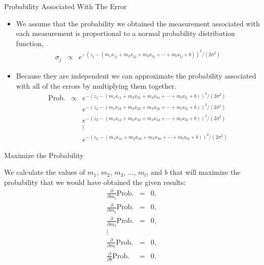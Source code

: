 \documentclass[svgnames,table,,aspectratio=169]{beamer}
\begin{document}
\begin{frame}{Probability Associated With The Error}

  \begin{itemize}
  \item We assume that the probability we obtained the measurement
    associated with each measurement is proportional to a normal
    probability distribution function,
    \begin{eqnarray*}
      \sigma_j & \propto & e^{-\left(z_j - \left(m_1 x_{1j} + m_2 x_{2j} + m_3 x_{3j} + \cdots + m_l x_{lj} + b\right)\right)^2/(2\sigma^2)}
    \end{eqnarray*}
  \item Because they are independent we can approximate the
    probability associated with all of the errors by multiplying them
    together.
    \begin{eqnarray*}
      \mathrm{Prob.} & \propto & e^{-\left(z_1 - \left(m_1 x_{11} + m_2 x_{21} + m_3 x_{31} + \cdots + m_l x_{l1} + b\right)\right)^2/(2\sigma^2)} \\
      & & e^{-\left(z_2 - \left(m_1 x_{12} + m_2 x_{22} + m_3 x_{32} + \cdots + m_l x_{l2} + b\right)\right)^2/(2\sigma^2)} \\
      & & e^{-\left(z_3 - \left(m_1 x_{13} + m_2 x_{23} + m_3 x_{33} + \cdots + m_l x_{l3} + b\right)\right)^2/(2\sigma^2)} \\
      & & \vdots \\
      & & e^{-\left(z_n - \left(m_1 x_{1n} + m_2 x_{2n} + m_3 x_{3n} + \cdots + m_l x_{ln} + b\right)\right)^2/(2\sigma^2)} 
    \end{eqnarray*}
    
  \end{itemize}
  
\end{frame}

\begin{frame}{Maximize the Probability}

  We calculate the values of $m_1$, $m_2$, $m_3$, $\ldots$, $m_l$, and
  $b$ that will maximize the probability that we would have obtained the given results:
  \begin{eqnarray*}
    \frac{\partial}{\partial m_1} \mathrm{Prob.} & = & 0, \\
    \frac{\partial}{\partial m_2} \mathrm{Prob.} & = & 0, \\
    \frac{\partial}{\partial m_3} \mathrm{Prob.} & = & 0, \\
    \vdots & & \\
    \frac{\partial}{\partial m_l} \mathrm{Prob.} & = & 0, \\
    \frac{\partial}{\partial b} \mathrm{Prob.} & = & 0.
  \end{eqnarray*}
  
\end{frame}
\end{document}

